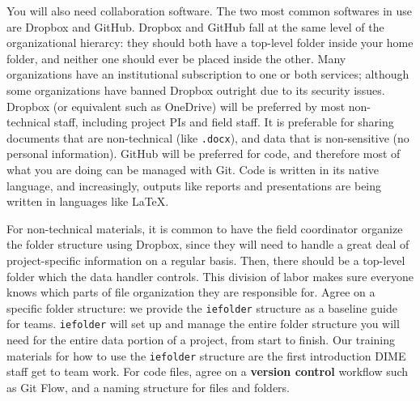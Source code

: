 You will also need collaboration software.
The two most common softwares in use are Dropbox and GitHub.
Dropbox and GitHub fall at the same level of the organizational hierarcy:
they should both have a top-level folder inside your home folder,
and neither one should ever be placed inside the other.
Many organizations have an institutional subscription to one or both services;
although some organizations have banned Dropbox outright due to its security issues.
Dropbox (or equivalent such as OneDrive) will be preferred by most non-technical staff,
including project PIs and field staff.
It is preferable for sharing documents that are non-technical (like \texttt{.docx}),
and data that is non-sensitive (no personal information).
GitHub will be preferred for code,
and therefore most of what you are doing can be managed with Git.
Code is written in its native language,
and increasingly, outputs like reports
and presentations
are being written in languages like \LaTeX.

For non-technical materials,
it is common to have the field coordinator organize
the folder structure using Dropbox,
since they will need to handle a great deal of
project-specific information on a regular basis.
Then, there should be a top-level folder which the data handler controls.
This division of labor makes sure everyone knows
which parts of file organization they are responsible for.
Agree on a specific folder structure: we provide the
\texttt{iefolder}
structure as a baseline guide for teams.
\texttt{iefolder} will set up and manage the entire folder structure
you will need for the entire data portion of a project, from start to finish.
Our training materials for how to use the \texttt{iefolder} structure
are the first introduction DIME staff get to team work.
For code files, agree on a \textbf{version control}\cite{blischak2016quick} workflow such as
Git Flow,
and a naming structure for files and folders.

